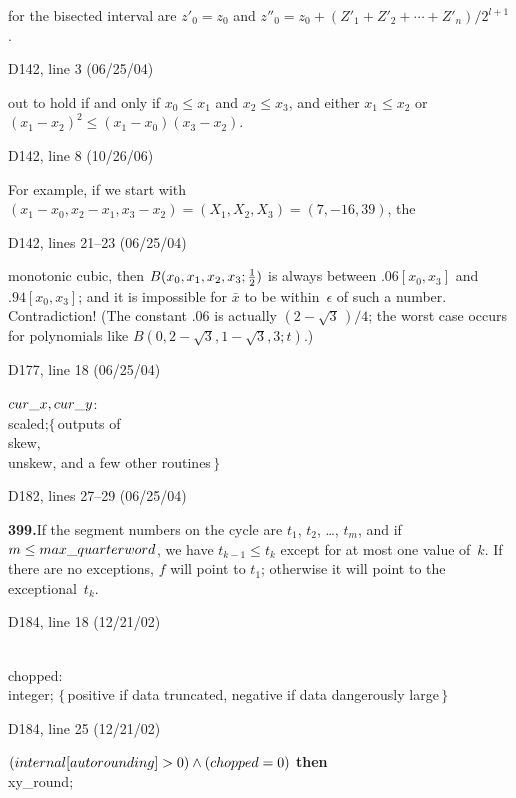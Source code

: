 {{\tenpoint\noindent
for the bisected interval are $z'_0=z_0$
and $z''_0=z_0+(Z'_1+Z'_2+\cdots+Z'_n)/2^{l+1}$.

\bugonpage D142, line 3 (06/25/04)

\tenpoint\noindent
out to hold if and only if $x_0\le x_1$ and $x_2\le x_3$, and either
$x_1\le x_2$ or $(x_1-x_2)^2\le(x_1-x_0)(x_3-x_2)$.\cutpar

\bugonpage D142, line 8 (10/26/06)

\tenpoint\noindent\quad
For example, if we start with $(x_1-x_0,x_2-x_1,x_3-x_2)=
(X_1,X_2,X_3)=(7,-16,39)$, the\cutpar

\bugonpage D142, lines 21--23 (06/25/04)

\tenpoint\noindent
monotonic
cubic, then $B(x_0,x_1,x_2,x_3;{1\over2})$ is always between
$.06[x_0,x_3]$ and $.94[x_0,x_3]$; and it is impossible for $\bar x$
to be within~$\epsilon$ of such a number. Contradiction!
(The constant .06 is actually $(2-\sqrt3\,)/4$; the worst case
occurs for polynomials like $B(0,2-\sqrt3,1-\sqrt3,3;t)$.)

\bugonpage D177, line 18 (06/25/04)

\ninepoint\noindent
$\\{cur\_x},\\{cur\_y}$: \\{scaled};\quad$\{\,$outputs of \\{skew},
 \\{unskew}, and a few other routines$\,\}$

\bugonpage D182, lines 27--29 (06/25/04)

\noindent
{\bf399.\quad}If
 the segment numbers on the cycle are $t_1$, $t_2$, \dots, $t_m$,
and if $m\le\\{max\_quarterword}$,
we have $t_{k-1}\le t_k$ except for at most one value of~$k$. If there are
no exceptions, $f$ will point to $t_1$; otherwise it will point to the
exceptional~$t_k$.

\bugonpage D184, line 18 (12/21/02)

\ninepoint\noindent
\qquad\\{chopped}: \\{integer};\quad
$\{\,$positive if data truncated, negative if data dangerously large$\,\}$

\bugonpage D184, line 25 (12/21/02)

\ninepoint\noindent
{} $(\\{internal}[\\{autorounding}]>0)\land(\\{chopped}=0)$
 {\bf then} \\{xy\_round};

}}
